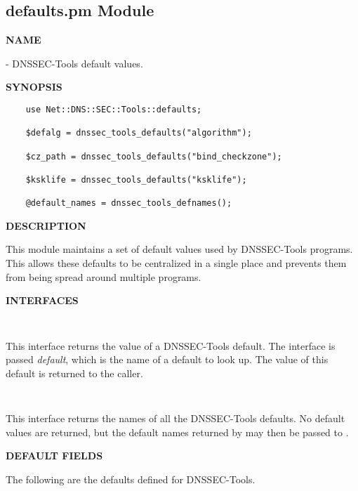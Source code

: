 \clearpage

\subsection{\bf defaults.pm Module}

{\bf NAME}

 - DNSSEC-Tools default values.

{\bf SYNOPSIS}

\begin{verbatim}
    use Net::DNS::SEC::Tools::defaults;

    $defalg = dnssec_tools_defaults("algorithm");

    $cz_path = dnssec_tools_defaults("bind_checkzone");

    $ksklife = dnssec_tools_defaults("ksklife");

    @default_names = dnssec_tools_defnames();
\end{verbatim}

{\bf DESCRIPTION}

This module maintains a set of default values used by DNSSEC-Tools
programs.  This allows these defaults to be centralized in a single
place and prevents them from being spread around multiple programs.

{\bf INTERFACES}

\begin{description}

\item {}\verb" "

This interface returns the value of a DNSSEC-Tools default.  The interface
is passed {\it default}, which is the name of a default to look up.  The value
of this default is returned to the caller.

\item {}\verb" "

This interface returns the names of all the DNSSEC-Tools defaults.
No default values are returned, but the default names returned by
 may then be passed to
.

\end{description}

{\bf DEFAULT FIELDS}

The following are the defaults defined for DNSSEC-Tools.


